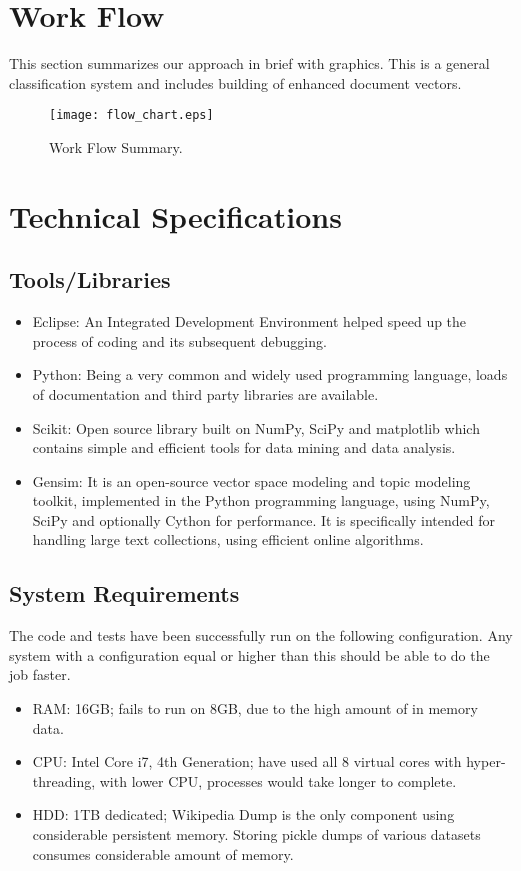 \section{Work Flow}
This section summarizes our approach in brief with graphics. This is a general classification system and includes building of enhanced document vectors.
\begin{figure}[H]
\centering
\texttt{[image: flow\_chart.eps]}
\caption{Work Flow Summary. \label{fig:flow_chart}}
\end{figure}

\section{Technical Specifications}
\subsection{Tools/Libraries}
\begin{itemize}
	\item Eclipse: An Integrated Development Environment helped speed up the process of coding and its subsequent debugging.
	\item Python: Being a very common and widely used programming language, loads of  documentation and third party libraries are available.
	\item Scikit: Open source library built on NumPy, SciPy and matplotlib which contains simple and efficient tools for data mining and data analysis.
	\item Gensim: It is an open-source vector space modeling and topic modeling toolkit, implemented in the Python programming language, using NumPy, SciPy and optionally Cython for performance. It is specifically intended for handling large text collections, using efficient online algorithms.
\end{itemize}

\subsection{System Requirements}
The code and tests have been successfully run on the following configuration. Any system with a configuration equal or higher than this should be able to do the job faster.
\begin{itemize}
	\item RAM: 16GB; fails to run on 8GB, due to the high amount of in memory data.
	\item CPU: Intel Core i7, 4th Generation; have used all 8 virtual cores with hyper-threading, with lower CPU, processes would take longer to complete.
	\item HDD: 1TB dedicated; Wikipedia Dump is the only component using considerable persistent memory. Storing pickle dumps of various datasets consumes considerable amount of memory.
\end{itemize}
